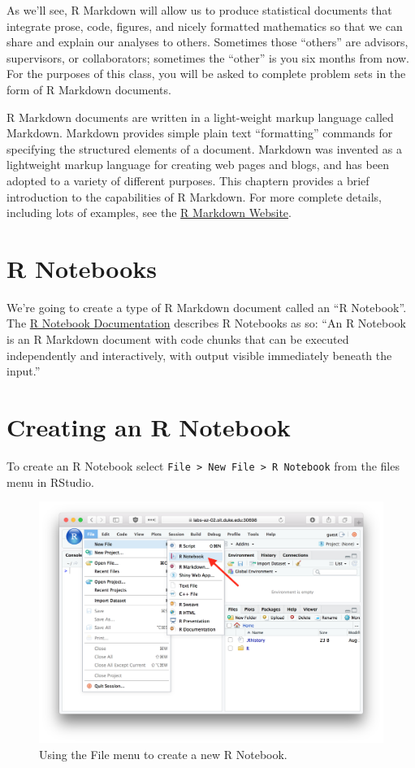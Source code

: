 \documentclass[]{book}
\theoremstyle{definition}
\theoremstyle{definition}
\theoremstyle{definition}
\theoremstyle{remark}
\begin{document}
As we'll see, R Markdown will allow us to produce statistical documents
that integrate prose, code, figures, and nicely formatted mathematics so
that we can share and explain our analyses to others. Sometimes those
``others'' are advisors, supervisors, or collaborators; sometimes the
``other'' is you six months from now. For the purposes of this class,
you will be asked to complete problem sets in the form of R Markdown
documents.

R Markdown documents are written in a light-weight markup language
called Markdown. Markdown provides simple plain text ``formatting''
commands for specifying the structured elements of a document. Markdown
was invented as a lightweight markup language for creating web pages and
blogs, and has been adopted to a variety of different purposes. This
chaptern provides a brief introduction to the capabilities of R
Markdown. For more complete details, including lots of examples, see the
\href{http://rmarkdown.rstudio.com/index.html}{R Markdown Website}.

\hypertarget{r-notebooks}{%
\section{R Notebooks}\label{r-notebooks}}

We're going to create a type of R Markdown document called an ``R
Notebook''. The \href{http://rmarkdown.rstudio.com/r_notebooks.html}{R
Notebook Documentation} describes R Notebooks as so: ``An R Notebook is
an R Markdown document with code chunks that can be executed
independently and interactively, with output visible immediately beneath
the input.''

\hypertarget{creating-an-r-notebook}{%
\section{Creating an R Notebook}\label{creating-an-r-notebook}}

To create an R Notebook select
\texttt{File\ \textgreater{}\ New\ File\ \textgreater{}\ R\ Notebook}
from the files menu in RStudio.

\begin{figure}

{\centering \includegraphics[width=0.6\linewidth]{./figures/fig-create-rnotebook} 

}

\caption{Using the File menu to create a new R Notebook.}\label{fig:unnamed-chunk-75}
\end{figure}
\end{document}
